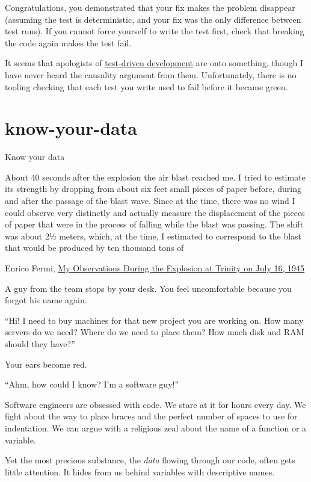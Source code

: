 \documentclass{article}
\begin{document}
Congratulations, you demonstrated that your fix makes the problem disappear (assuming the test is deterministic, and your fix was the only difference between test runs).
If you cannot force yourself to write the test first, check that breaking the code again makes the test fail.

It seems that apologists of \href{https://en.wikipedia.org/wiki/Test-driven_development}{test-driven development} are onto something, though I have never heard the causality argument from them.
Unfortunately, there is no tooling checking that each test you write used to fail before it became green.

\section{know-your-data}{Know your data}
\epigraph{
  About 40 seconds after the explosion the air blast reached me.
  I tried to estimate its strength by dropping from about six feet small pieces of paper before, during and after the passage of the blast wave.
  Since at the time, there was no wind I could observe very distinctly and actually measure the displacement of the pieces of paper that were in the process of falling while the blast was passing.
  The shift was about 2½ meters, which, at the time, I estimated to correspond to the blast that would be produced by ten thousand tons of 
}{Enrico Fermi, \href{https://www.atomicarchive.com/resources/documents/trinity/fermi.html}{My Observations During the Explosion at Trinity on July 16, 1945}}

A guy from the  team stops by your desk.
You feel uncomfortable because you forgot his name again.

``Hi! I need to buy machines for that new project you are working on.
How many servers do we need?
Where do we need to place them? 
How much disk and RAM should they have?''

Your ears become red.

``Ahm, how could I know? I'm a software guy!''

Software engineers are obsessed with code.
We stare at it for hours every day.
We fight about the way to place braces and the perfect number of spaces to use for indentation.
We can argue with a religious zeal about the name of a function or a variable.

Yet the most precious substance, the \emph{data} flowing through our code, often gets little attention.
It hides from us behind variables with descriptive names.
\end{document}
